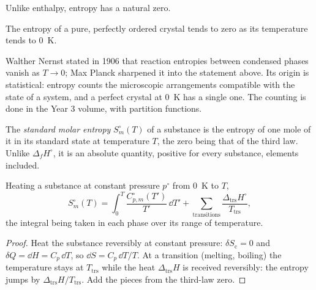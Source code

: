 Unlike enthalpy, entropy has a natural zero.

\begin{theorem}\label{thm:b2:reaction-free-energy:third-law}
The entropy of a pure, perfectly ordered crystal tends to zero as its
temperature tends to \qty{0}{K}.
\end{theorem}
\admitted

\begin{remark}\label{rem:b2:reaction-free-energy:third-law}
Walther Nernst stated in 1906 that reaction entropies between condensed
phases vanish as $T \to 0$; Max Planck sharpened it into the statement
above. Its origin is statistical: entropy counts the microscopic
arrangements compatible with the state of a system, and a perfect crystal
at \qty{0}{K} has a single one. The counting is done in the Year 3 volume,
with partition functions.
\end{remark}

\begin{definition}\label{def:b2:reaction-free-energy:standard-entropy}
The \emph{standard molar entropy}
$S^\circ_m(T)$ of a substance is the entropy of one mole of it in its
standard state at temperature $T$, the zero being that of the third law.
Unlike $\Delta_f H^\circ$, it is an absolute quantity, positive for every
substance, elements included.
\end{definition}

\begin{proposition}\label{prop:b2:reaction-free-energy:absolute-entropy}
Heating a substance at constant pressure $p^\circ$ from \qty{0}{K} to $T$,
\[
  S^\circ_m(T) = \int_0^T\frac{C^\circ_{p,m}(T')}{T'}\,\dd T' +
  \sum_{\text{transitions}}\frac{\Delta_{\text{trs}}H^\circ}{T_{\text{trs}}} ,
\]
the integral being taken in each phase over its range of temperature.
\end{proposition}

\begin{proof}
Heat the substance reversibly at constant pressure: $\delta S_{\text{c}} =
0$ and $\delta Q = \dd H = C_p\,\dd T$, so $\dd S = C_p\,\dd T/T$. At a
transition (melting, boiling) the temperature stays at $T_{\text{trs}}$
while the heat $\Delta_{\text{trs}}H$ is received reversibly: the entropy
jumps by $\Delta_{\text{trs}}H/T_{\text{trs}}$. Add the pieces from the
third-law zero.
\end{proof}

